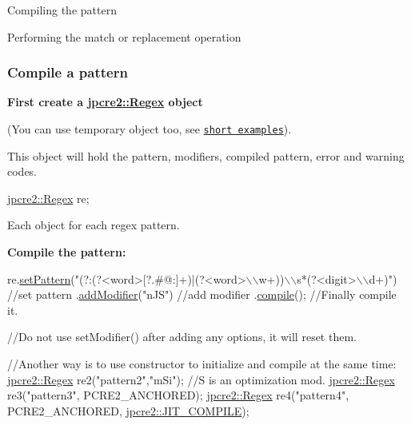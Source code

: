 \begin{DoxyEnumerate}
\item Compiling the pattern
\item Performing the match or replacement operation
\end{DoxyEnumerate}\hypertarget{index_compile-a-pattern}{}\subsubsection{Compile a pattern}\label{index_compile-a-pattern}
{\bfseries First create a {\ttfamily \hyperlink{classjpcre2_1_1Regex}{jpcre2\+::\+Regex}} object}

(You can use temporary object too, see \href{#short-examples}{\tt short examples}).

This object will hold the pattern, modifiers, compiled pattern, error and warning codes.


\begin{DoxyCode}
\hyperlink{classjpcre2_1_1Regex}{jpcre2::Regex} re;
\end{DoxyCode}
 Each object for each regex pattern.

{\bfseries Compile the pattern\+:}


\begin{DoxyCode}
re.\hyperlink{classjpcre2_1_1Regex_a85d9a514ea86ae68533223adac6c6bd8_a85d9a514ea86ae68533223adac6c6bd8}{setPattern}(\textcolor{stringliteral}{"(?:(?<word>[?.#@:]+)|(?<word>\(\backslash\)\(\backslash\)w+))\(\backslash\)\(\backslash\)s*(?<digit>\(\backslash\)\(\backslash\)d+)"})  \textcolor{comment}{//set pattern}
  .\hyperlink{classjpcre2_1_1Regex_ab1af1471339602446d8221b8c97c6b55_ab1af1471339602446d8221b8c97c6b55}{addModifier}(\textcolor{stringliteral}{"nJS"})                                                   \textcolor{comment}{//add modifier}
  .\hyperlink{classjpcre2_1_1Regex_aad1d5ef1e87f762f68a587eec4022e69_aad1d5ef1e87f762f68a587eec4022e69}{compile}();                                                           \textcolor{comment}{//Finally compile it.}

\textcolor{comment}{//Do not use setModifier() after adding any options, it will reset them.}

\textcolor{comment}{//Another way is to use constructor to initialize and compile at the same time:}
\hyperlink{classjpcre2_1_1Regex}{jpcre2::Regex} re2(\textcolor{stringliteral}{"pattern2"},\textcolor{stringliteral}{"mSi"});  \textcolor{comment}{//S is an optimization mod.}
\hyperlink{classjpcre2_1_1Regex}{jpcre2::Regex} re3(\textcolor{stringliteral}{"pattern3"}, PCRE2\_ANCHORED);
\hyperlink{classjpcre2_1_1Regex}{jpcre2::Regex} re4(\textcolor{stringliteral}{"pattern4"}, PCRE2\_ANCHORED, \hyperlink{namespacejpcre2_a85c143271501e383843f45b9999c2f00_a85c143271501e383843f45b9999c2f00a5e8bab7c478015b19baf3e84ed00876e}{jpcre2::JIT\_COMPILE});
\end{DoxyCode}



